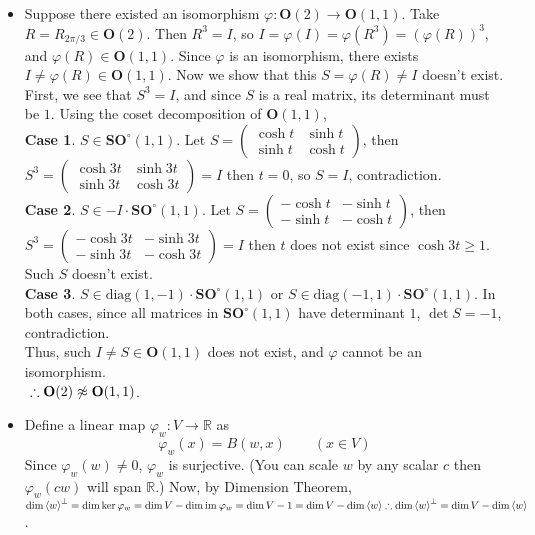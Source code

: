 \documentclass[12pt]{report}
\newcommand{\numl}[1]{\item[\large\textbf{\sffamily #1}]}
\newcommand{\bb}[1]{\mathbb{#1}}
\newcommand{\rmbf}[1]{\mathrm{\mathbf{#1}}}
\renewcommand{\span}[1]{\left\langle #1 \right\rangle}
\newcommand{\im}{\text{im}\:}
\newcommand{\diag}{\text{diag}}
\begin{document}
\begin{itemize}
\numl{13.4.6} Suppose there existed an isomorphism $\varphi : \rmbf{O}(2) \rightarrow \rmbf{O}(1, 1)$. Take $R = R_{2\pi/3} \in \rmbf{O}(2)$. Then $R^3 = I$, so $I = \varphi(I) = \varphi(R^3) = (\varphi(R))^3$, and $\varphi(R)\in \rmbf{O}(1, 1)$. Since $\varphi$ is an isomorphism, there exists $I\neq\varphi(R)\in\rmbf{O}(1, 1)$. Now we show that this $S=\varphi(R) \neq I$ doesn't exist.\\
First, we see that $S^3=I$, and since $S$ is a real matrix, its determinant must be $1$. Using the coset decomposition of $\rmbf{O}(1, 1)$,\\
\textbf{\sffamily Case 1}. $S\in \rmbf{SO}^\circ(1, 1)$. Let $S = \begin{pmatrix}
\cosh t & \sinh t \\ \sinh t & \cosh t
\end{pmatrix}$, then $S^3 = \begin{pmatrix}
\cosh 3t & \sinh 3t \\ \sinh 3t & \cosh 3t
\end{pmatrix} = I$ then $t = 0$, so $S = I$, contradiction.\\
\textbf{\sffamily Case 2}. $S \in -I\cdot \rmbf{SO}^\circ(1, 1)$. Let $S = \begin{pmatrix}
-\cosh t & -\sinh t \\ -\sinh t & -\cosh t
\end{pmatrix}$, then $S^3 = \begin{pmatrix}
-\cosh 3t & -\sinh 3t \\ -\sinh 3t & -\cosh 3t
\end{pmatrix} = I$ then $t$ does not exist since $\cosh 3t \geq 1$. Such $S$ doesn't exist.\\
\textbf{\sffamily Case 3}. $S \in \diag (1, -1)\cdot \rmbf{SO}^\circ(1, 1)$ or $S \in \diag(-1, 1)\cdot \rmbf{SO}^\circ(1, 1)$. In both cases, since all matrices in $\rmbf{SO}^\circ(1, 1)$ have determinant $1$, $\det S = -1$, contradiction.\\
Thus, such $I\neq S \in \rmbf{O}(1, 1)$ does not exist, and $\varphi$ cannot be an isomorphism.
\\ $~\hfill \therefore \rmbf{O}(2) \not\approx \rmbf{O}(1, 1)$.

\numl{13.5.7} Define a linear map $\varphi_w : V \rightarrow \bb{R}$ as $$\varphi_w(x) = B(w, x) \qquad (x\in V)$$ Since $\varphi_w(w) \neq 0$, $\varphi_w$ is surjective. (You can scale $w$ by any scalar $c$ then $\varphi_w(cw)$ will span $\bb{R}$.) Now, by Dimension Theorem, $\dim \span{w}^\perp = \dim \ker \varphi_w = \dim V - \dim \im \varphi_w = \dim V - 1 = \dim V - \dim \span{w}  \hfill \therefore \dim \span{w}^\perp = \dim V -\dim\span{w}$.


\end{itemize}
\end{document}
